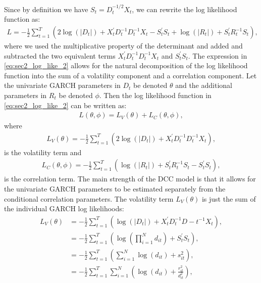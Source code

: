 Since by definition we have $S_t = D_t^{-1/2}X_t$, we can rewrite the log likelihood function as:
\begin{align}
	L = -\frac{1}{2} \sum_{t=1}^T (2\operatorname{log}(|D_t|) + X_t^\prime D_t^{-1}D_t^{-1}X_t - S_t^\prime S_t +  \operatorname{log}(|R_t|) + S_t^\prime R_t^{-1}S_t ), \label{eq:sec2_log_like_2}
\end{align}
where we used the multiplicative property of the determinant and added and subtracted the two equivalent terms $X_t^\prime D_t^{-1}D_t^{-1}X_t$ and $S_t^\prime S_t$. The expression in \eqref{eq:sec2_log_like_2} allows for the natural decomposition of the log likelihood function into the sum of a volatility component and a correlation component. Let the univariate GARCH parameters in $D_t$ be denoted $\theta$ and the additional parameters in $R_t$ be denoted $\phi$. Then the log likelihood function in \eqref{eq:sec2_log_like_2} can be written as:
\begin{align}
	L(\theta,\phi) = L_V(\theta) + L_C(\theta,\phi), \label{eq:sec2_log_like_decomp}
\end{align}
where
\begin{align}
	L_V(\theta) = -\frac{1}{2} \sum_{t=1}^T (2 \operatorname{log}(|D_t|) + X_t^\prime D_t^{-1}D_t^{-1}X_t), \label{eq:sec2_log_like_v}
\end{align}
is the volatility term and
\begin{align}
	L_C(\theta, \phi) = -\frac{1}{2}\sum_{t=1}^T (\operatorname{log}(|R_t|) + S_t^\prime R_t^{-1}S_t - S_t^\prime S_t), \label{eq:sec2_log_like_c}
\end{align}
is the correlation term. The main strength of the DCC model is that it allows for the univariate GARCH parameters to be estimated separately from the conditional correlation parameters. The volatility term $L_V(\theta)$ is just the sum of the individual GARCH log likelihoods:
\begin{align}
	L_V(\theta) &= -\frac{1}{2} \sum_{t=1}^T (\operatorname{log}(|D_t|) + X_t^\prime D_t^{-1} D-t^{-1}X_t), \\
	 &= -\frac{1}{2} \sum_{t=1}^T \left(\operatorname{log}\left( \prod_{i=1}^N d_{it} \right) + S_t^\prime S_t \right), \\
	 &= -\frac{1}{2} \sum_{t=1}^T \left( \sum_{i=1}^N \operatorname{log}(d_{it}) + s_{it}^2 \right), \\ 
	 &= - \frac{1}{2} \sum_{t=1}^T\sum_{i=1}^N \left(\operatorname{log}(d_{it}) + \frac{r_{it}^2}{d_{it}^2}\right),
\end{align}

